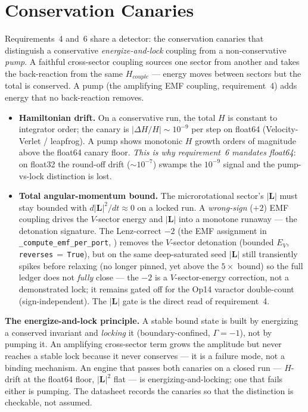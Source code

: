 \section{Conservation Canaries}
\label{sec:vol9_engine_conservation_canaries}

Requirements~4 and~6 share a detector: the conservation canaries that distinguish a conservative \emph{energize-and-lock} coupling from a non-conservative \emph{pump}. A faithful cross-sector coupling sources one sector from another and takes the back-reaction from the same $H_{couple}$ --- energy moves between sectors but the total is conserved. A pump (the amplifying EMF coupling, requirement~4) adds energy that no back-reaction removes.

\begin{itemize}
    \item \textbf{Hamiltonian drift.} On a conservative run, the total $H$ is constant to integrator order; the canary is $|\Delta H / H| \sim 10^{-9}$ per step on float64 (Velocity-Verlet / leapfrog). A pump shows monotonic $H$ growth orders of magnitude above the float64 canary floor. \emph{This is why requirement~6 mandates float64}: on float32 the round-off drift ($\sim 10^{-7}$) swamps the $10^{-9}$ signal and the pump-vs-lock distinction is lost.
    \item \textbf{Total angular-momentum bound.} The microrotational sector's $|\mathbf{L}|$ must stay bounded with $d|\mathbf{L}|^2/dt \approx 0$ on a locked run. A \emph{wrong-sign} ($+2$) EMF coupling drives the $V$-sector energy and $|\mathbf{L}|$ into a monotone runaway --- the detonation signature. The Lenz-correct $-2$ (the EMF assignment in \texttt{\_compute\_emf\_per\_port}, ) removes the $V$-sector detonation (bounded $E_V$, \texttt{reverses}\,$=$\,\texttt{True}), but on the same deep-saturated seed $|\mathbf{L}|$ still transiently spikes before relaxing (no longer pinned, yet above the $5\times$ bound) so the full ledger does not \emph{fully} close --- the $-2$ is a $V$-sector-energy correction, not a demonstrated lock; it remains gated off for the Op14 varactor double-count (sign-independent). The $|\mathbf{L}|$ gate is the direct read of requirement~4.
\end{itemize}

\noindent
\textbf{The energize-and-lock principle.} A stable bound state is built by energizing a conserved invariant and \emph{locking} it (boundary-confined, $\Gamma = -1$\gammaundeclared{}), not by pumping it. An amplifying cross-sector term grows the amplitude but never reaches a stable lock because it never conserves --- it is a failure mode, not a binding mechanism. An engine that passes both canaries on a closed run --- $H$-drift at the float64 floor, $|\mathbf{L}|^2$ flat --- is energizing-and-locking; one that fails either is pumping. The datasheet records the canaries so that the distinction is checkable, not assumed.

